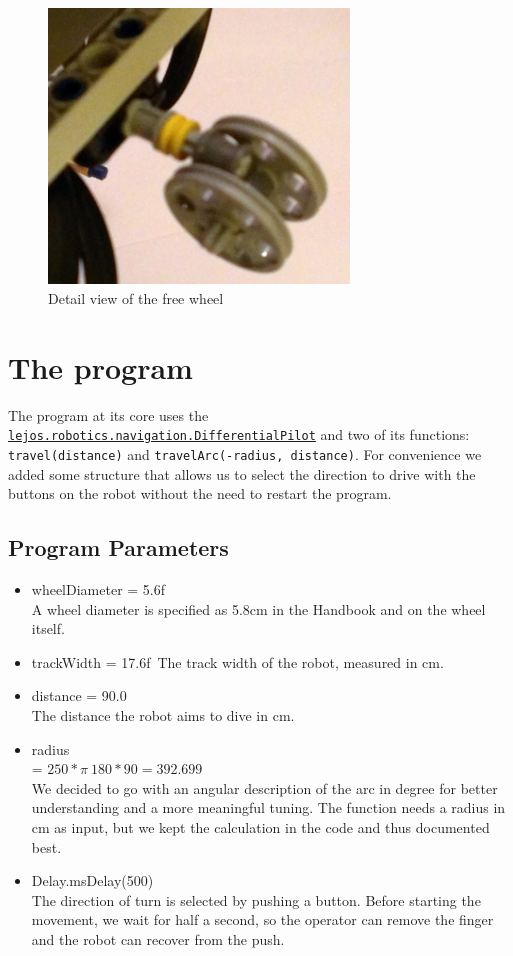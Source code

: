 \documentclass{scrartcl}
\begin{document}
\begin{figure}
 \center
 \includegraphics[width= 8cm]{img/steering_wheel.jpg}
 \caption{Detail view of the free wheel}
 \label{fig:free_wheel}
\end{figure}


\section{The program}

The program at its core uses the \texttt{
\href{http://www.lejos.org/nxt/nxj/api/lejos/robotics/navigation/DifferentialPilot.html}{lejos.robotics.navigation.DifferentialPilot}} and two of its functions: \texttt{travel(distance)} and \texttt{travelArc(-radius, distance)}. For convenience we added some structure that allows us to select the direction to drive with the buttons on the robot without the need to restart the program.

\subsection{Program Parameters}
\begin{itemize}
\item wheelDiameter = 5.6f\\
A wheel diameter is specified as 5.8cm in the Handbook and on the wheel itself.

\item trackWidth = 17.6f\
The track width of the robot, measured in cm.

\item distance = 90.0\\
The distance the robot aims to dive in cm.

\item radius\\
 = $250 * \pi \ 180 * 90 = 392.699$\\
 We decided to go with an angular description of the arc in degree for better understanding and a more meaningful tuning. The function needs a radius in cm as input, but we kept the calculation in the code and thus documented best.

\item Delay.msDelay(500)\\
The direction of turn is selected by pushing a button. Before starting the movement, we wait for half a second, so the operator can remove the finger and the robot can recover from the push.
\end{itemize}
\end{document}
